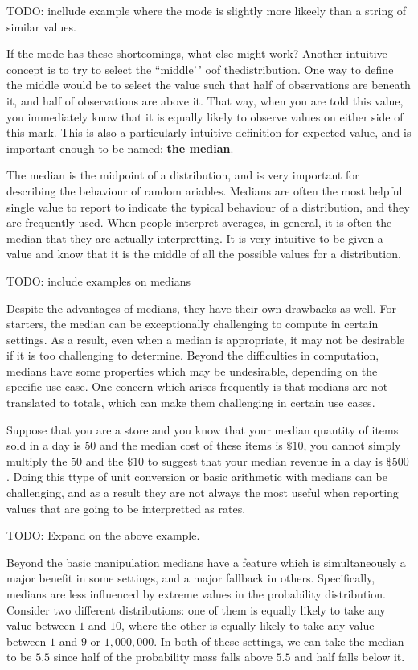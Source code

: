 \documentclass[
  letterpaper,
  DIV=11,
  numbers=noendperiod]{scrreprt}
\begin{document}
TODO: incllude example where the mode is slightly more likeely than a
string of similar values.

If the mode has these shortcomings, what else might work? Another
intuitive concept is to try to select the ``middle'\,' oof
thedistribution. One way to define the middle would be to select the
value such that half of observations are beneath it, and half of
observations are above it. That way, when you are told this value, you
immediately know that it is equally likely to observe values on either
side of this mark. This is also a particularly intuitive definition for
expected value, and is important enough to be named: \textbf{the
median}.

The median is the midpoint of a distribution, and is very important for
describing the behaviour of random ariables. Medians are often the most
helpful single value to report to indicate the typical behaviour of a
distribution, and they are frequently used. When people interpret
averages, in general, it is often the median that they are actually
interpretting. It is very intuitive to be given a value and know that it
is the middle of all the possible values for a distribution.

TODO: include examples on medians

Despite the advantages of medians, they have their own drawbacks as
well. For starters, the median can be exceptionally challenging to
compute in certain settings. As a result, even when a median is
appropriate, it may not be desirable if it is too challenging to
determine. Beyond the difficulties in computation, medians have some
properties which may be undesirable, depending on the specific use case.
One concern which arises frequently is that medians are not translated
to totals, which can make them challenging in certain use cases.

Suppose that you are a store and you know that your median quantity of
items sold in a day is \(50\) and the median cost of these items is
\(\$10\), you cannot simply multiply the \(50\) and the \(\$10\) to
suggest that your median revenue in a day is \(\$500\). Doing this ttype
of unit conversion or basic arithmetic with medians can be challenging,
and as a result they are not always the most useful when reporting
values that are going to be interpretted as rates.

TODO: Expand on the above example.

Beyond the basic manipulation medians have a feature which is
simultaneously a major benefit in some settings, and a major fallback in
others. Specifically, medians are less influenced by extreme values in
the probability distribution. Consider two different distributions: one
of them is equally likely to take any value between \(1\) and \(10\),
where the other is equally likely to take any value between \(1\) and
\(9\) or \(1,000,000\). In both of these settings, we can take the
median to be \(5.5\) since half of the probability mass falls above
\(5.5\) and half falls below it.
\end{document}
